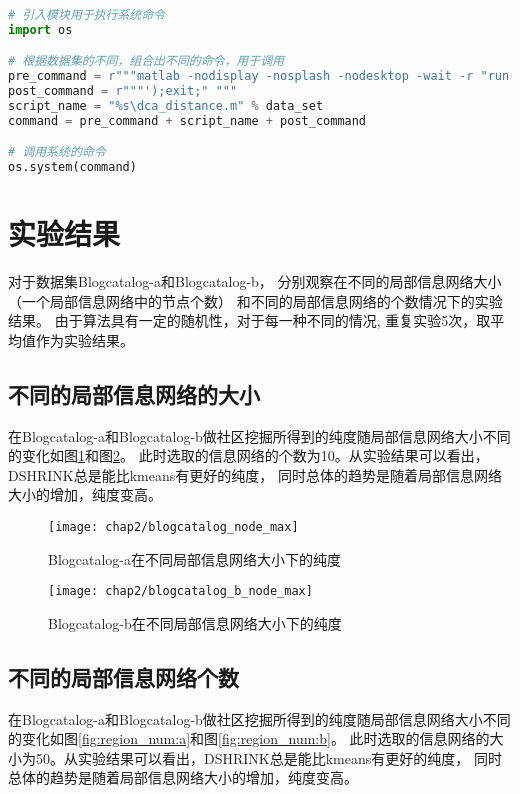 \begin{lstlisting}[language={python}, caption={计算聚类的纯度}, label=code:call]

# 引入模块用于执行系统命令
import os

# 根据数据集的不同，组合出不同的命令，用于调用
pre_command = r"""matlab -nodisplay -nosplash -nodesktop -wait -r "run('"""
post_command = r"""');exit;" """
script_name = "%s\dca_distance.m" % data_set
command = pre_command + script_name + post_command

# 调用系统的命令
os.system(command)
\end{lstlisting}

\section{实验结果}
\label{sec:results}
对于数据集Blogcatalog-a和Blogcatalog-b，
分别观察在不同的局部信息网络大小（一个局部信息网络中的节点个数）
和不同的局部信息网络的个数情况下的实验结果。
由于算法具有一定的随机性，对于每一种不同的情况,
重复实验5次，取平均值作为实验结果。

\subsection{不同的局部信息网络的大小}
\label{sec:results_node_max}

在Blogcatalog-a和Blogcatalog-b做社区挖掘所得到的纯度随局部信息网络大小不同的变化如图\ref{fig:node_max:a}和图\ref{fig:node_max:b}。
此时选取的信息网络的个数为10。从实验结果可以看出，DSHRINK总是能比kmeans有更好的纯度，
同时总体的趋势是随着局部信息网络大小的增加，纯度变高。

\begin{figure}
    \texttt{[image: chap2/blogcatalog\_node\_max]}
    \caption{Blogcatalog-a在不同局部信息网络大小下的纯度}
    \label{fig:node_max:a}
\end{figure}

\begin{figure}
    \texttt{[image: chap2/blogcatalog\_b\_node\_max]}
    \caption{Blogcatalog-b在不同局部信息网络大小下的纯度}
    \label{fig:node_max:b}
\end{figure}

\subsection{不同的局部信息网络个数}
\label{sec:results_region_num}

在Blogcatalog-a和Blogcatalog-b做社区挖掘所得到的纯度随局部信息网络大小不同的变化如图\ref{fig:region_num:a}和图\ref{fig:region_num:b}。
此时选取的信息网络的大小为50。从实验结果可以看出，DSHRINK总是能比kmeans有更好的纯度，
同时总体的趋势是随着局部信息网络大小的增加，纯度变高。

